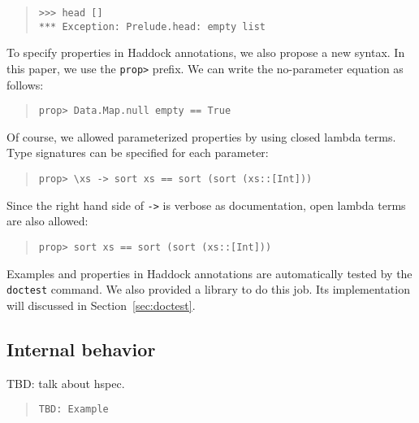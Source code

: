 \documentclass[preprint]{sigplanconf}
\begin{document}
\begin{quote}
\small
\begin{verbatim}
>>> head []
*** Exception: Prelude.head: empty list
\end{verbatim}
\end{quote}

To specify properties in Haddock annotations, we also propose a new syntax. In this paper, we use the {\tt prop>} prefix. We can write the no-parameter equation as follows:

\begin{quote}
\small
\begin{verbatim}
prop> Data.Map.null empty == True
\end{verbatim}
\end{quote}

\noindent Of course, we allowed parameterized properties by
using closed lambda terms.
Type signatures can be specified for each parameter:

\begin{quote}
\small
\begin{verbatim}
prop> \xs -> sort xs == sort (sort (xs::[Int]))
\end{verbatim}
\end{quote}

\noindent Since the right hand side of {\tt ->} is verbose as documentation,
open lambda terms are also allowed:

\begin{quote}
\small
\begin{verbatim}
prop> sort xs == sort (sort (xs::[Int]))
\end{verbatim}
\end{quote}

Examples and properties in Haddock annotations are automatically
tested by the {\tt doctest} command. We also provided a library
to do this job. Its implementation will discussed in Section~\ref{sec:doctest}.

\subsection{Internal behavior}
\label{sec:Internal-behavior}

TBD: talk about hspec.

\begin{quote}
\small
\begin{verbatim}
TBD: Example
\end{verbatim}
\end{quote}
\end{document}
